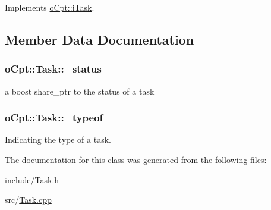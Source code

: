 Implements \hyperlink{classo_cpt_1_1i_task_aedb88813b16914598dee9561813e56e8}{o\+Cpt\+::i\+Task}.



\subsection{Member Data Documentation}
\subsubsection[{\texorpdfstring{\+\_\+status}{_status}}]{ o\+Cpt\+::\+Task\+::\+\_\+status\hspace{0.3cm}{\ttfamily [protected]}}\hypertarget{classo_cpt_1_1_task_a51a0e1718a13e6d59af76511e6473743}{}\label{classo_cpt_1_1_task_a51a0e1718a13e6d59af76511e6473743}


a boost share\+\_\+ptr to the status of a task 

\subsubsection[{\texorpdfstring{\+\_\+typeof}{_typeof}}]{ o\+Cpt\+::\+Task\+::\+\_\+typeof\hspace{0.3cm}{\ttfamily [protected]}}\hypertarget{classo_cpt_1_1_task_ac4073446fdd30a1f2296da6b6fcaf802}{}\label{classo_cpt_1_1_task_ac4073446fdd30a1f2296da6b6fcaf802}


Indicating the type of a task. 



The documentation for this class was generated from the following files\+:\begin{DoxyCompactItemize}
\item 
include/\hyperlink{_task_8h}{Task.\+h}\item 
src/\hyperlink{_task_8cpp}{Task.\+cpp}\end{DoxyCompactItemize}
